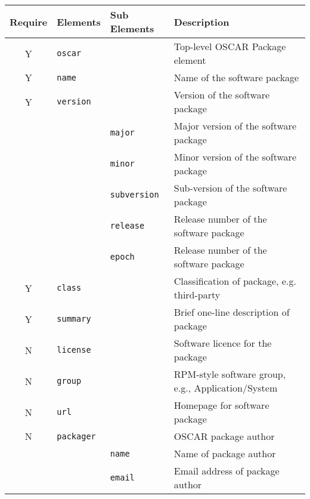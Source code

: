 \begin{table}[htbp]
  \begin{center}
  \begin{tabular}{|c|l|l|l|} \hline
  {\bfseries Require} & {\bfseries Elements} & {\bfseries Sub Elements} & {\bfseries Description}\\\hline
  \hline



  Y & \verb(oscar(   &   & Top-level OSCAR Package element               \\ \hline
  Y & \verb(name(    &   & Name of the software package                  \\ \hline


  Y & \verb(version(& & Version of the software package           \\\cline{3-4}
    & & \verb(major(  & Major version of the software package     \\\cline{3-4}
    & & \verb(minor(  & Minor version of the software package     \\\cline{3-4}
    & & \verb(subversion( & Sub-version of the software package   \\\cline{3-4}
    & & \verb(release(    & Release number of the software package\\\cline{3-4}
    & & \verb(epoch(      & Release number of the software package\\\hline


  Y & \verb(class(   &   & Classification of package, e.g. third-party   \\ \hline
  Y & \verb(summary( &   & Brief one-line description of package         \\ \hline
  N & \verb(license( &   & Software licence for the package              \\ \hline
  N & \verb(group(   &   & RPM-style software group, e.g., Application/System\\\hline
  N & \verb(url(     &   & Homepage for software package                 \\ \hline


  N & \verb(packager(&   & OSCAR package author                      \\\cline{3-4}
    & & \verb(name(   & Name of package author                    \\\cline{3-4}
    & & \verb(email(  & Email address of package author           \\\hline



\end{tabular}
\end{center}
\end{table}
